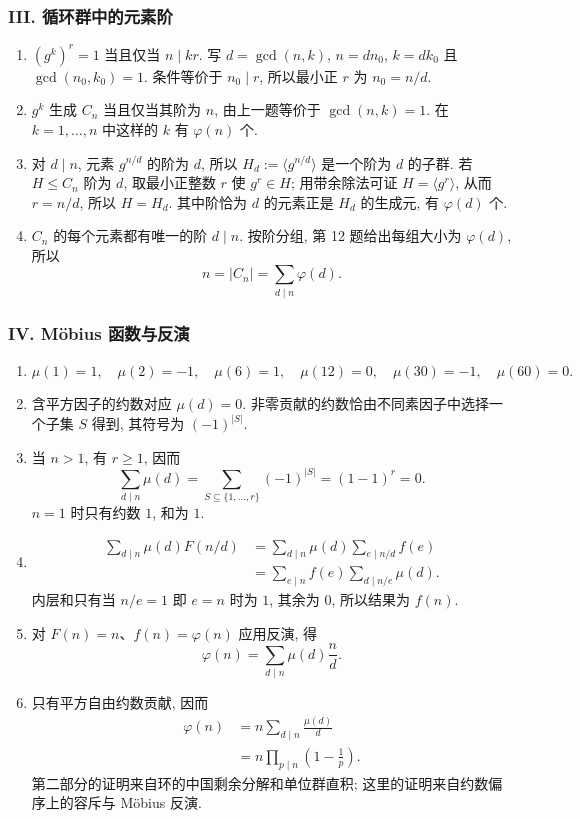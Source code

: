 \documentclass[usesamecnt, thmcnt=section, lang=cn, newtx, 10pt, scheme=chinese]{elegantbook}
\begin{document}
\subsubsection*{III. 循环群中的元素阶}
\begin{enumerate}[label=\textbf{\arabic*.}, start=10]
  \item $(g^k)^r=1$ 当且仅当 $n\mid kr$. 写 $d=\gcd(n,k)$, $n=dn_0$, $k=dk_0$ 且 $\gcd(n_0,k_0)=1$. 条件等价于 $n_0\mid r$, 所以最小正 $r$ 为 $n_0=n/d$.
  \item $g^k$ 生成 $C_n$ 当且仅当其阶为 $n$, 由上一题等价于 $\gcd(n,k)=1$. 在 $k=1,\ldots,n$ 中这样的 $k$ 有 $\varphi(n)$ 个.
  \item 对 $d\mid n$, 元素 $g^{n/d}$ 的阶为 $d$, 所以 $H_d:=\langle g^{n/d}\rangle$ 是一个阶为 $d$ 的子群. 若 $H\leq C_n$ 阶为 $d$, 取最小正整数 $r$ 使 $g^r\in H$; 用带余除法可证 $H=\langle g^r\rangle$, 从而 $r=n/d$, 所以 $H=H_d$. 其中阶恰为 $d$ 的元素正是 $H_d$ 的生成元, 有 $\varphi(d)$ 个.
  \item $C_n$ 的每个元素都有唯一的阶 $d\mid n$. 按阶分组, 第 12 题给出每组大小为 $\varphi(d)$, 所以
  \[
   n=|C_n|=\sum_{d\mid n}\varphi(d).
  \]
\end{enumerate}

\subsubsection*{IV. Möbius 函数与反演}
\begin{enumerate}[label=\textbf{\arabic*.}, start=14]
  \item
  \[
  \mu(1)=1,\quad \mu(2)=-1,\quad \mu(6)=1,\quad
  \mu(12)=0,\quad \mu(30)=-1,\quad \mu(60)=0.
  \]
  \item 含平方因子的约数对应 $\mu(d)=0$. 非零贡献的约数恰由不同素因子中选择一个子集 $S$ 得到, 其符号为 $(-1)^{|S|}$.
  \item 当 $n>1$, 有 $r\geq1$, 因而
  \[
   \sum_{d\mid n}\mu(d)
   =\sum_{S\subseteq\{1,\ldots,r\}}(-1)^{|S|}
   =(1-1)^r=0.
  \]
  $n=1$ 时只有约数 $1$, 和为 $1$.
  \item
  \[
  \begin{aligned}
   \sum_{d\mid n}\mu(d)F(n/d)
   &=\sum_{d\mid n}\mu(d)\sum_{e\mid n/d}f(e)\\
   &=\sum_{e\mid n}f(e)\sum_{d\mid n/e}\mu(d).
  \end{aligned}
  \]
  内层和只有当 $n/e=1$ 即 $e=n$ 时为 $1$, 其余为 $0$, 所以结果为 $f(n)$.
  \item 对 $F(n)=n$、$f(n)=\varphi(n)$ 应用反演, 得
  \[
   \varphi(n)=\sum_{d\mid n}\mu(d)\frac nd.
  \]
  \item 只有平方自由约数贡献, 因而
  \[
  \begin{aligned}
   \varphi(n)
   &=n\sum_{d\mid n}\frac{\mu(d)}d\\
   &=n\prod_{p\mid n}\left(1-\frac1p\right).
  \end{aligned}
  \]
  第二部分的证明来自环的中国剩余分解和单位群直积; 这里的证明来自约数偏序上的容斥与 Möbius 反演.
\end{enumerate}
\end{document}
